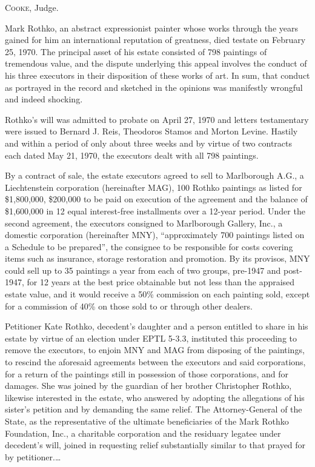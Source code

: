 

\opinion \textsc{Cooke}, Judge.

Mark Rothko, an abstract expressionist painter whose works through the years
gained for him an international reputation of greatness, died testate on
February 25, 1970. The principal asset of his estate consisted of 798 paintings
of tremendous value, and the dispute underlying this appeal involves the conduct
of his three executors in their disposition of these works of art. In sum, that
conduct as portrayed in the record and sketched in the opinions was manifestly
wrongful and indeed shocking.

Rothko's will was admitted to probate on April 27, 1970 and letters testamentary
were issued to Bernard J. Reis, Theodoros Stamos and Morton Levine. Hastily and
within a period of only about three weeks and by virtue of two contracts each
dated May 21, 1970, the executors dealt with all 798 paintings.

By a contract of sale, the estate executors agreed to sell to Marlborough A.G.,
a Liechtenstein corporation (hereinafter MAG), 100 Rothko paintings as listed
for \$1,800,000, \$200,000 to be paid on execution of the agreement and the
balance of \$1,600,000 in 12 equal interest-free installments over a 12-year
period. Under the second agreement, the executors consigned to Marlborough
Gallery, Inc., a domestic corporation (hereinafter MNY), ``approximately 700
paintings listed on a Schedule to be prepared'', the consignee to be responsible
for costs covering items such as insurance, storage restoration and promotion.
By its provisos, MNY could sell up to 35 paintings a year from each of two
groups, pre-1947 and post-1947, for 12 years at the best price obtainable but
not less than the appraised estate value, and it would receive a 50\% commission
on each painting sold, except for a commission of 40\% on those sold to or
through other dealers.

Petitioner Kate Rothko, decedent's daughter and a person entitled to share in
his estate by virtue of an election under EPTL 5-3.3, instituted this proceeding
to remove the executors, to enjoin MNY and MAG from disposing of the paintings,
to rescind the aforesaid agreements between the executors and said corporations,
for a return of the paintings still in possession of those corporations, and for
damages. She was joined by the guardian of her brother Christopher Rothko,
likewise interested in the estate, who answered by adopting the allegations of
his sister's petition and by demanding the same relief. The Attorney-General of
the State, as the representative of the ultimate beneficiaries of the Mark
Rothko Foundation, Inc., a charitable corporation and the residuary legatee
under decedent's will, joined in requesting relief substantially similar to that
prayed for by petitioner.\ldots

